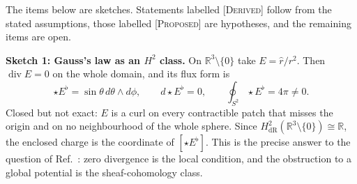 \documentclass[10pt]{article}
\begin{document}
The items below are sketches. Statements labelled \textsc{[Derived]} follow from the stated assumptions, those labelled \textsc{[Proposed]} are hypotheses, and the remaining items are open.

\begin{center}
\end{center}

\noindent\textbf{Sketch 1: Gauss's law as an $H^2$ class.} On $\mathbb R^3\setminus\{0\}$ take $E=\hat r/r^2$. Then $\operatorname{div}E=0$ on the whole domain, and its flux form is
\begin{equation}
\star E^\flat=\sin\theta\,d\theta\wedge d\phi,\qquad d\star E^\flat=0,\qquad \oint_{S^2}\star E^\flat=4\pi\ne0.\tag{S1}\label{e:S1}
\end{equation}
Closed but not exact: $E$ is a curl on every contractible patch that misses the origin and on no neighbourhood of the whole sphere. Since $H^2_{\mathrm{dR}}(\mathbb R^3\setminus\{0\})\cong\mathbb R$, the enclosed charge is the coordinate of $[\star E^\flat]$. This is the precise answer to the question of Ref.~\cite{ghani}: zero divergence is the local condition, and the obstruction to a global potential is the sheaf-cohomology class.
\end{document}
